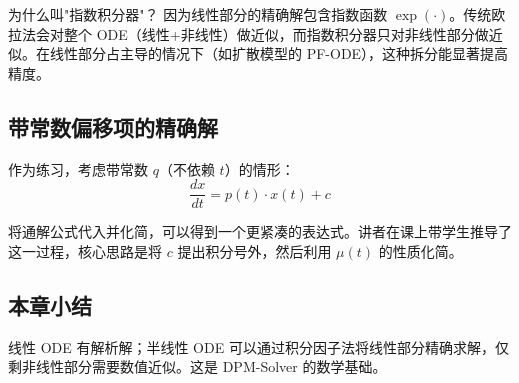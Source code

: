 \begin{knowledgebox}{为什么叫"指数积分器"？}
因为线性部分的精确解包含指数函数 $\exp(\cdot)$。传统欧拉法会对整个 ODE（线性+非线性）做近似，而指数积分器只对非线性部分做近似。在线性部分占主导的情况下（如扩散模型的 PF-ODE），这种拆分能显著提高精度。
\end{knowledgebox}

\subsection{带常数偏移项的精确解}

作为练习，考虑带常数 $q$（不依赖 $t$）的情形：
$$\frac{dx}{dt} = p(t) \cdot x(t) + c$$

将通解公式代入并化简，可以得到一个更紧凑的表达式。讲者在课上带学生推导了这一过程，核心思路是将 $c$ 提出积分号外，然后利用 $\mu(t)$ 的性质化简。

\subsection{本章小结}

线性 ODE 有解析解；半线性 ODE 可以通过积分因子法将线性部分精确求解，仅剩非线性部分需要数值近似。这是 DPM-Solver 的数学基础。


